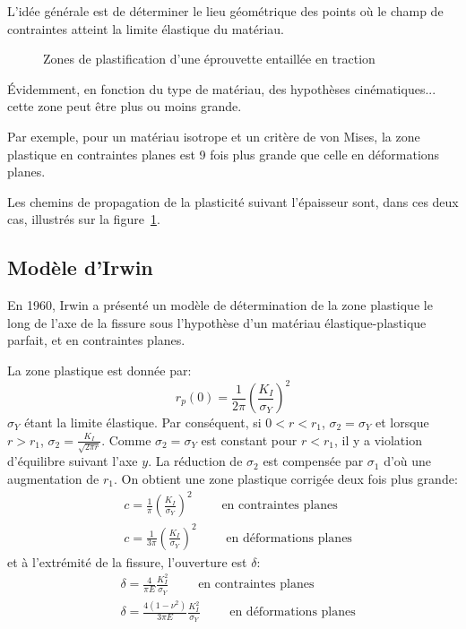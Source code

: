 L'idée générale est de déterminer le lieu géométrique des points où le
champ de contraintes atteint la limite élastique du matériau.
\begin{figure}[ht]\centering
{}\hspace{9em}
\caption{Zones de plastification d'une éprouvette entaillée en traction}\label{fig:propagation}
\end{figure}
Évidemment, en fonction du type de matériau, des hypothèses cinématiques...
cette zone peut être plus ou moins grande.

\medskip
Par exemple, pour un matériau isotrope et un critère de von Mises, la zone plastique en
contraintes planes est 9 fois plus grande que celle en déformations planes.

\medskip
Les chemins de propagation de la plasticité suivant l'épaisseur sont, dans ces deux cas,
illustrés sur la figure~\ref{fig:propagation}.


\medskip
\subsection{Modèle d'Irwin}
En 1960, Irwin a présenté un modèle
de détermination de la zone plastique le long de l'axe  de la fissure sous l'hypothèse d'un matériau
élastique-plastique parfait, et en contraintes planes.

La zone plastique est donnée par:
\begin{equation}r_p(0)=\frac1{2\pi}\left(\frac{K_I}{\sigma_Y}\right)^2
\end{equation}$\sigma_Y$ étant la limite élastique.
Par conséquent, si $0<r<r_1$, $\sigma_2=\sigma_Y$ et lorsque $r>r_1$, $\sigma_2=\frac{K_I}{\sqrt{2\pi r}}$.
Comme $\sigma_2=\sigma_Y$ est constant pour $r < r_1$, il y a violation d'équilibre suivant l'axe $y$.
La réduction de $\sigma_2$ est compensée par $\sigma_1$ d'où une augmentation de $r_1$.
On obtient une zone plastique corrigée deux fois plus grande:
\begin{align}
&c = \frac1\pi\left(\frac{K_I}{\sigma_Y}\right)^2 \qquad \text{ en contraintes planes}\\
&c = \frac1{3\pi}\left(\frac{K_I}{\sigma_Y}\right)^2 \qquad \text{ en déformations planes}
\end{align}
et à l'extrémité de la fissure, l'ouverture est $\delta$:
\begin{align}
&\delta = \frac4{\pi E}\frac{K_I^2}{\sigma_Y} \qquad \text{ en contraintes planes}\\
&\delta = \frac{4(1-\nu^2)}{3\pi E}\frac{K_I^2}{\sigma_Y} \qquad \text{ en déformations planes}
\end{align}

